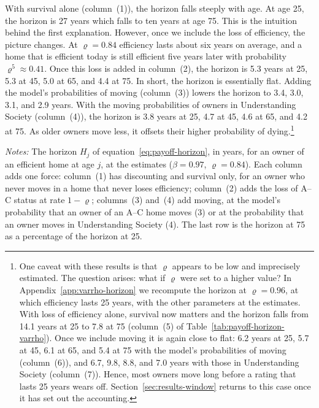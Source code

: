With survival alone (column~(1)), the horizon falls steeply with age. At age 25, the horizon is 27 years which falls to ten years at age 75. This is the
intuition behind the first explanation. However, once we include the  loss of efficiency, the picture changes. At $\varrho=0.84$ efficiency lasts about six years on average, and
a home that is efficient today is still efficient five years later with
probability $\varrho^5\approx0.41$. Once this loss is added in column~(2), the horizon is
5.3 years at 25, 5.3 at 45, 5.0 at 65, and 4.4 at 75. In short, the horizon is essentially flat. Adding the model's probabilities of moving (column~(3)) lowers the horizon
to 3.4, 3.0, 3.1, and 2.9 years. With the moving probabilities of owners in
Understanding Society (column~(4)), the horizon is 3.8 years at 25, 4.7 at 45, 4.6 at 65, and 4.2 at 75.
As older owners move less, it offsets their higher probability of dying.\footnote{One caveat with these results is that $\varrho$ appears to be low and imprecisely estimated. The question arises: what if $\varrho$ were set to a higher value? In  Appendix~\ref{app:varrho-horizon} we recompute the horizon at
$\varrho=0.96$, at which efficiency lasts 25 years, with the other
parameters at the estimates. With loss of
efficiency alone, survival now matters and the horizon falls from 14.1 years at
25 to 7.8 at 75 (column~(5) of Table~\ref{tab:payoff-horizon-varrho}). Once we  include
moving it is again close to flat: 6.2 years at 25, 5.7 at 45, 6.1
at 65, and 5.4 at 75 with the model's probabilities of moving (column~(6)),
and 6.7, 9.8, 8.8, and 7.0 years with those in Understanding Society
(column~(7)). Hence, most owners move long before a rating that lasts 25 years wears
off. Section~\ref{sec:results-window} returns to this case once it has set
out the accounting.}

\begin{table}[t]
  \centering
  \caption[Payoff horizon of an efficient home, by age]{{Payoff
  horizon of an efficient home, by age}}\label{tab:payoff-horizon}
  \begin{threeparttable}
    \small
    \begin{tablenotes}[flushleft]\footnotesize
      \item {\textit{Notes:} The horizon $H_j$ of
      equation~\eqref{eq:payoff-horizon}, in years, for an owner of an
      efficient home at age $j$, at the estimates ($\beta=0.97$,
      $\varrho=0.84$). Each column adds one force: column~(1)
      has discounting and survival only, for an owner who never moves in a
      home that never loses efficiency; column~(2) adds the loss of A--C
      status at rate $1-\varrho$; columns~(3) and~(4) add moving, at the
      model's probability that an owner of an A--C home moves (3) or at the
      probability that an owner moves in Understanding Society (4). The last row is the horizon at
      75 as a percentage of the horizon at 25.}
    \end{tablenotes}
  \end{threeparttable}
\end{table}





